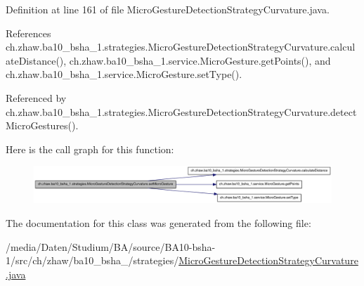 Definition at line 161 of file MicroGestureDetectionStrategyCurvature.java.

References ch.zhaw.ba10\_\-bsha\_\-1.strategies.MicroGestureDetectionStrategyCurvature.calculateDistance(), ch.zhaw.ba10\_\-bsha\_\-1.service.MicroGesture.getPoints(), and ch.zhaw.ba10\_\-bsha\_\-1.service.MicroGesture.setType().

Referenced by ch.zhaw.ba10\_\-bsha\_\-1.strategies.MicroGestureDetectionStrategyCurvature.detectMicroGestures().

Here is the call graph for this function:\nopagebreak
\begin{figure}[H]
\begin{center}
\leavevmode
\includegraphics[width=420pt]{classch_1_1zhaw_1_1ba10__bsha__1_1_1strategies_1_1MicroGestureDetectionStrategyCurvature_a8e53337041e648e2e5f9c72cc74d7a0e_cgraph}
\end{center}
\end{figure}


The documentation for this class was generated from the following file:\begin{DoxyCompactItemize}
\item 
/media/Daten/Studium/BA/source/BA10-\/bsha-\/1/src/ch/zhaw/ba10\_\-bsha\_/strategies/\hyperlink{MicroGestureDetectionStrategyCurvature_8java}{MicroGestureDetectionStrategyCurvature.java}\end{DoxyCompactItemize}
